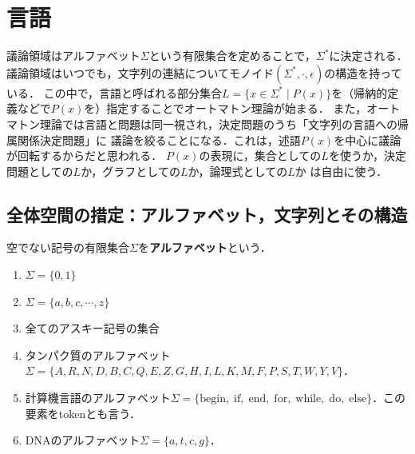 \documentclass[uplatex, dvipdfmx]{jsreport}
\begin{document}
\section{言語}

\begin{screen}
    議論領域はアルファベット$\Sigma$という有限集合を定めることで，$\Sigma^*$に決定される．
    議論領域はいつでも，文字列の連結についてモノイド$(\Sigma^*,\cdot,\epsilon)$の構造を持っている．
    この中で，言語と呼ばれる部分集合$L=\{x\in\Sigma^*\mid P(x)\}$を（帰納的定義などで$P(x)$を）指定することでオートマトン理論が始まる．
    また，オートマトン理論では言語と問題は同一視され，決定問題のうち「文字列の言語への帰属関係決定問題」に
    議論を絞ることになる．これは，述語$P(x)$を中心に議論が回転するからだと思われる．
    $P(x)$の表現に，集合としての$L$を使うか，決定問題としての$L$か，グラフとしての$L$か，論理式としての$L$か
    は自由に使う．
\end{screen}

\subsection{全体空間の措定：アルファベット，文字列とその構造}

\begin{definition}[alphabet]
    空でない記号の有限集合$\Sigma$を\textbf{アルファベット}という．
\end{definition}
\begin{example}\mbox{}
    \begin{enumerate}
        \item $\Sigma=\{0,1\}$
        \item $\Sigma=\{a,b,c,\cdots,z\}$
        \item 全てのアスキー記号の集合
        \item タンパク質のアルファベット$\Sigma=\{A,R,N,D,B,C,Q,E,Z,G,H,I,L,K,M,F,P,S,T,W,Y,V\}$．
        \item 計算機言語のアルファベット$\Sigma=\{\mathrm{begin,\;if,\;end,\;for,\;while,\;do,\;else}\}$．この要素をtokenとも言う．
        \item DNAのアルファベット$\Sigma=\{a,t,c,g\}$．
    \end{enumerate}
\end{example}
\end{document}
